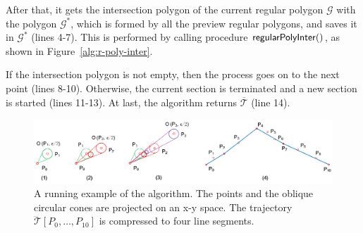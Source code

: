 After that, it gets the intersection polygon of the current regular polygon $\mathcal{G}$ with the polygon $\mathcal{G}^*$, which is formed by all the preview regular polygons, and saves it in $\mathcal{G}^*$ (lines 4-7).
This is performed by calling procedure ${\mathsf{regularPolyInter}}()$, as shown in Figure~\ref{alg:r-poly-inter}.

If the intersection polygon is not empty, then the process goes on to the next point (lines 8-10).
Otherwise, the current section is terminated and a new section is started (lines 11-13).
%
At last, the algorithm returns $\overline{\mathcal{T}}$ (line 14).




\begin{figure}[tb!]
\centering
\includegraphics[scale=0.8]{figures/Fig-ex-conest.png}
\vspace{-1ex}
\caption{\small A running example of the \cist algorithm. The points and the oblique circular cones are projected on an x-y space. The trajectory $\dddot{\mathcal{T}}[P_0, \ldots, P_{10}]$ is compressed to four line segments.}
\vspace{-2ex}
\label{fig:exm-const}
\end{figure}




